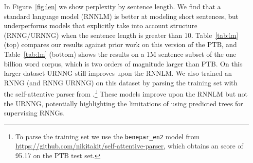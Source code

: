\documentclass[11pt,a4paper]{article}
\begin{document}
In Figure~\ref{fig:len} we show perplexity by sentence length. We find that a standard language model (RNNLM) is better at modeling short sentences, but underperforms models that explicitly take into account structure (RNNG/URNNG) when the sentence length is greater than 10.
Table~\ref{tab:lm} (top) compares our results against prior work on this version of the PTB, and Table~\ref{tab:lm} (bottom) shows the results on a 1M sentence subset of the one billion word corpus, which is two orders of magnitude larger than PTB. On this larger
dataset URNNG still improves upon the RNNLM. We also trained an RNNG (and RNNG  URNNG) on this dataset by parsing the training set with the self-attentive parser from \citet{kitaev2018parsing}.\footnote{To parse the training set we use the \texttt{benepar\_en2} model from  \url{https://github.com/nikitakit/self-attentive-parser}, which obtains an  score of 95.17 on the PTB test set.} These models improve upon the RNNLM but not the URNNG, potentially highlighting the limitations of using predicted trees for supervising RNNGs.
\end{document}
